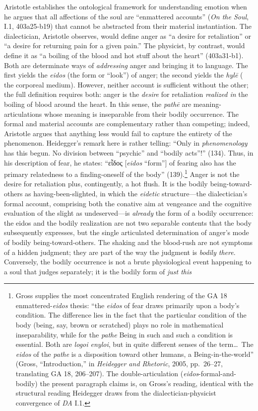 \documentclass{article}
\newcommand{\gk}[1]{{\greekfont #1}}
\begin{document}
Aristotle  establishes the ontological framework for understanding emotion when he argues that all affections of the soul are ``enmattered accounts'' (\textit{On the Soul}, I.1, 403a25-b19) that cannot be abstracted from their material instantiation. The dialectician, Aristotle observes, would define anger as ``a desire for retaliation'' or ``a desire for returning pain for a given pain.'' The physicist, by contrast, would define it as ``a boiling of the blood and hot stuff about the heart'' (403a31-b1). Both are determinate ways of \textit{addressing} anger and bringing it to language. The first yields the \textit{eidos} (the form or ``look'') of anger; the second yields the \textit{hylē} ( the corporeal medium). However, neither account is sufficient without the other; the full definition requires both: anger is the \textit{desire} for retaliation \textit{realized in} the boiling of blood around the heart. In this sense, the \textit{pathē} are meaning-articulations whose meaning is inseparable from their bodily occurrence. The formal and material accounts are complementary rather than competing; indeed, Aristotle argues that anything less would fail to capture the entirety of the phenomenon. Heidegger's remark here is rather telling: ``Only in \textit{phenomenology} has this begun. No division between ``psychic'' and ``bodily acts''!'' (134). Thus, in his description of fear, he states: ``\gk{εἶδος} [\textit{eidos} ``form''] of fearing also has the primary relatedness to a finding-oneself of the body'' (139).\footnote{Gross supplies the most concentrated English rendering of the GA 18 enmattered-\textit{eidos} thesis: ``the \textit{eidos} of fear draws primarily upon a body's condition. The difference lies in the fact that the particular condition of the body (being, say, brown or scratched) plays no role in mathematical inseparability, while for the \textit{pathe} Being in such and such a condition is essential. Both are \textit{logoi enyloi}, but in quite different senses of the term\ldots\ The \textit{eidos} of the \textit{pathe} is a disposition toward other humans, a Being-in-the-world'' (Gross, ``Introduction,'' in \textit{Heidegger and Rhetoric}, 2005, pp.~26--27, translating GA 18, 206--207). The double-articulation (\textit{eidos}-formal-and-bodily) the present paragraph claims is, on Gross's reading, identical with the structural reading Heidegger draws from the dialectician-physicist convergence of \textit{DA} I.1.} Anger is not the desire for retaliation plus, contingently, a hot flush. It is the bodily being-toward-others as having-been-slighted, in which the \textit{eidetic} structure---the dialectician's formal account, comprising both the conative aim at vengeance and the cognitive evaluation of the slight as undeserved---is \textit{already} the form of a bodily occurrence: the eidos and the bodily realization are not two separable contents that the body subsequently expresses, but the single articulated determination of anger's mode of bodily being-toward-others. The shaking and the blood-rush are not symptoms of a hidden judgment; they are part of the way the judgment is \textit{bodily there}. Conversely, the bodily occurrence is not a brute physiological event happening to a soul that judges separately; it is the bodily form of \textit{just this} 
\end{document}

